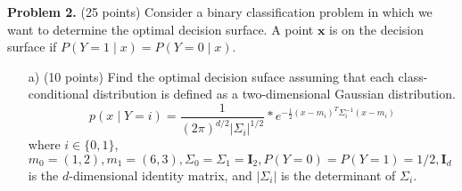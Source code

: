 \documentclass[a4 paper]{article}
\begin{document}
	\textbf{Problem 2.} (25 points) Consider a binary classification problem in which we want to determine the optimal decision surface. A point $\mathbf{x}$ is on the decision surface if $P(Y = 1 \mid x) = P(Y=0 \mid x)$.
	\begin{enumerate}
	\item[a)] (10 points) Find the optimal decision suface assuming that each class-conditional distribution is defined as a two-dimensional Gaussian distribution. 
	\begin{equation*}
	p(x \mid Y = i )  = \frac{1}{(2\pi)^{d/2}|\Sigma_i|^{1/2}} * e^{-\frac{1}{2}(x-m_i)^T\Sigma_i^{-1}(x-m_i)}
	\end{equation*}
	where $ i \in \{0,1\}$, $m_0 = (1,2), m_1=(6,3), \Sigma_0 = \Sigma_1 = \mathbf{I}_2, P(Y=0) = P(Y=1) = 1/2, \mathbf{I}_d$ is the $d$-dimensional identity matrix, and $|\Sigma_i|$ is the determinant of $\Sigma_i$.
	

\end{enumerate}
\end{document}
